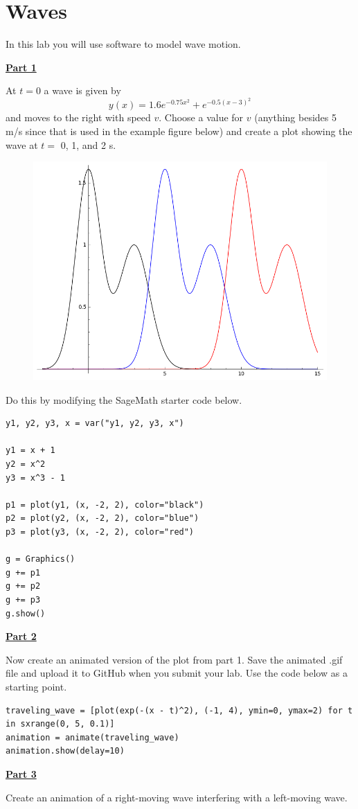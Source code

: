 \section{Waves}

In this lab you will use software to model wave motion.
\hfill \break

\underline{\textbf{Part 1}} \par
At $t = 0$ a wave is given by
\begin{equation}
y(x) = 1.6e^{-0.75x^2} + e^{-0.5(x-3)^2}
\end{equation}
and moves to the right with speed $v$.
Choose a value for $v$ (anything besides 5 m/s since that is used in the example figure below) and create a plot showing the wave at $t =$ 0, 1, and 2 s.
\begin{figure}[H]
\includegraphics[scale=0.50]{figures/waves/fig1.png}
\end{figure}
Do this by modifying the SageMath starter code below.
\begin{verbatim}
y1, y2, y3, x = var("y1, y2, y3, x")

y1 = x + 1
y2 = x^2
y3 = x^3 - 1

p1 = plot(y1, (x, -2, 2), color="black")
p2 = plot(y2, (x, -2, 2), color="blue")
p3 = plot(y3, (x, -2, 2), color="red")

g = Graphics()
g += p1
g += p2
g += p3
g.show()
\end{verbatim}

\underline{\textbf{Part 2}} \par
Now create an animated version of the plot from part 1.
Save the animated .gif file and upload it to GitHub when you submit your lab.
Use the code below as a starting point.
\begin{verbatim}
traveling_wave = [plot(exp(-(x - t)^2), (-1, 4), ymin=0, ymax=2) for t in sxrange(0, 5, 0.1)]
animation = animate(traveling_wave)
animation.show(delay=10)
\end{verbatim}

\underline{\textbf{Part 3}} \par
Create an animation of a right-moving wave interfering with a left-moving wave.

\pagebreak \clearpage

